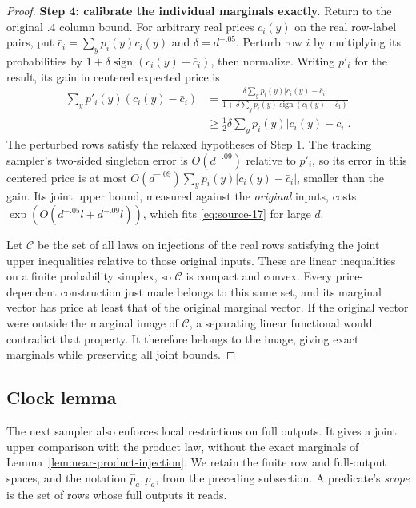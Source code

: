 \begin{proof}
\noindent\textbf{Step 4: calibrate the individual marginals exactly.}\quad
Return to the original \(.4\) column bound. For arbitrary real prices
\(c_i(y)\) on the real row-label pairs, put
\(\bar c_i=\sum_y p_i(y)c_i(y)\) and \(\delta=d^{-.05}\). Perturb row
\(i\) by multiplying its probabilities by
\(1+\delta\operatorname{sign}(c_i(y)-\bar c_i)\), then normalize.
Writing \(p'_i\) for the result, its gain in centered expected price is
\[
 \begin{aligned}
 \sum_y p'_i(y)(c_i(y)-\bar c_i)
 &=\frac{\delta\sum_y p_i(y)|c_i(y)-\bar c_i|}
        {1+\delta\sum_y p_i(y)\operatorname{sign}(c_i(y)-\bar c_i)}
 \\
 &\ge\tfrac12\delta\sum_y p_i(y)|c_i(y)-\bar c_i|.
 \end{aligned}
\]
The perturbed rows satisfy the relaxed hypotheses of Step 1. The
tracking sampler's two-sided singleton error is \(O(d^{-.09})\) relative
to \(p'_i\), so its error in this centered price is at most
\(O(d^{-.09})\sum_y p_i(y)|c_i(y)-\bar c_i|\), smaller than the gain.
Its joint upper bound, measured against the \emph{original} inputs, costs
\(\exp(O(d^{-.05}l+d^{-.09}l))\), which fits
\eqref{eq:source-17} for large \(d\).

Let \(\mathcal C\) be the set of all laws on injections of the real rows
satisfying the joint upper inequalities relative to those original
inputs. These are linear inequalities on a finite probability simplex,
so \(\mathcal C\) is compact and convex. Every price-dependent
construction just made belongs to this same set, and its marginal vector
has price at least that of the original marginal vector. If the original
vector were outside the marginal image of \(\mathcal C\), a separating
linear functional would contradict that property. It therefore belongs
to the image, giving exact marginals while preserving all joint bounds.
\end{proof}

\subsection{Clock lemma}
\label{sec:clock-lemma}

The next sampler also enforces local restrictions on full outputs. It
gives a joint upper comparison with the product law, without the exact
marginals of Lemma~\ref{lem:near-product-injection}. We retain the finite
row and full-output spaces, and the notation \(\widehat p_a,p_a\), from
the preceding subsection. A predicate's \emph{scope} is the set of rows
whose full outputs it reads.

